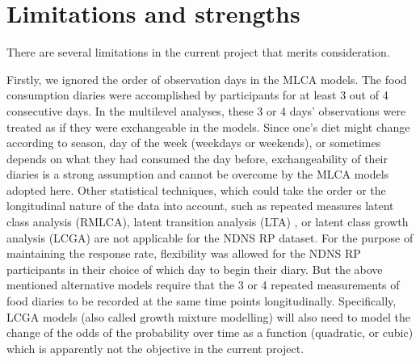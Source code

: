 










\section{Limitations and strengths}

There are several limitations in the current project that merits consideration.  

Firstly, we ignored the order of observation days in the MLCA models. The food consumption diaries were accomplished by participants for at least 3 out of 4 consecutive days. In the multilevel analyses, these 3 or 4 days' observations were treated as if they were exchangeable in the models. Since one's diet might change according to season, day of the week (weekdays or weekends), or sometimes depends on what they had consumed the day before, exchangeability of their diaries is a strong assumption and cannot be overcome by the MLCA models adopted here. Other statistical techniques, which could take the order or the longitudinal nature of the data into account, such as repeated measures latent class analysis (RMLCA), latent transition analysis (LTA) \parencite{collins2010latent}, or latent class growth analysis (LCGA) \parencite{davidian2008growth,jung2008introduction,andruff2009latent} are not applicable for the NDNS RP dataset. For the purpose of maintaining the response rate, flexibility was allowed for the NDNS RP participants in their choice of which day to begin their diary. But the above mentioned alternative models require that the 3 or 4 repeated measurements of food diaries to be recorded at the same time points longitudinally. Specifically, LCGA models (also called growth mixture modelling) will also need to model the change of the odds of the probability over time as a function (quadratic, or cubic) which is apparently not the objective in the current project. 

